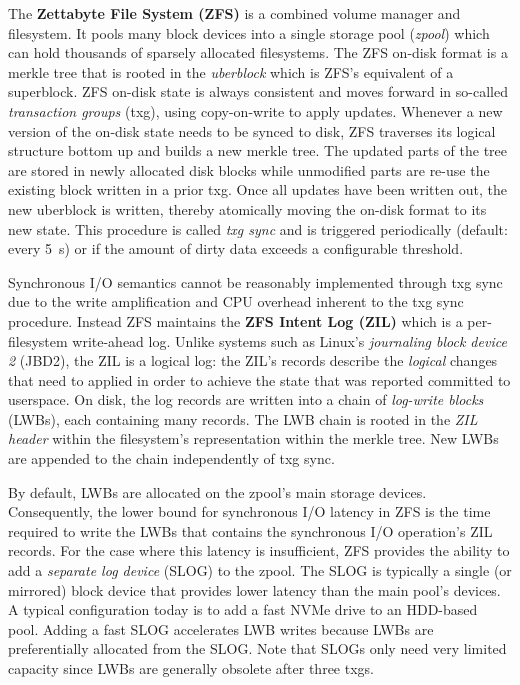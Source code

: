 \documentclass[12pt,a4paper,twoside]{book}
\begin{document}
The \textbf{Zettabyte File System (ZFS)} is a combined volume manager and filesystem.
It pools many block devices into a single storage pool (\textit{zpool}) which can hold thousands of sparsely allocated filesystems.
The ZFS on-disk format is a merkle tree that is rooted in the \textit{uberblock} which is ZFS's equivalent of a superblock.
ZFS on-disk state is always consistent and moves forward in so-called \textit{transaction groups} (txg), using copy-on-write to apply updates.
Whenever a new version of the on-disk state needs to be synced to disk, ZFS traverses its logical structure bottom up and builds a new merkle tree.
The updated parts of the tree are stored in newly allocated disk blocks while unmodified parts are re-use the existing block written in a prior txg.
Once all updates have been written out, the new uberblock is written, thereby atomically moving the on-disk format to its new state.
This procedure is called \textit{txg sync} and is triggered periodically (default: every \SI{5}{s}) or if the amount of dirty data exceeds a configurable threshold.

Synchronous I/O semantics cannot be reasonably implemented through txg sync due to the write amplification and CPU overhead inherent to the txg sync procedure.
Instead ZFS maintains the \textbf{ZFS Intent Log (ZIL)} which is a per-filesystem write-ahead log.
Unlike systems such as Linux's \textit{journaling block device 2} (JBD2), the ZIL is a logical log:
the ZIL's records describe the \textit{logical} changes that need to applied in order to achieve the state that was reported committed to userspace.
On disk, the log records are written into a chain of \textit{log-write blocks} (LWBs), each containing many records.
The LWB chain is rooted in the \textit{ZIL header} within the filesystem's representation within the merkle tree.
New LWBs are appended to the chain independently of txg sync.

By default, LWBs are allocated on the zpool's main storage devices.
Consequently, the lower bound for synchronous I/O latency in ZFS is the time required to write the LWBs that contains the synchronous I/O operation's ZIL records.
For the case where this latency is insufficient, ZFS provides the ability to add a \textit{separate log device} (SLOG) to the zpool.
The SLOG is typically a single (or mirrored) block device that provides lower latency than the main pool's devices.
A typical configuration today is to add a fast NVMe drive to an HDD-based pool.
Adding a fast SLOG accelerates LWB writes because LWBs are preferentially allocated from the SLOG.
Note that SLOGs only need very limited capacity since LWBs are generally obsolete after three txgs.
\end{document}
